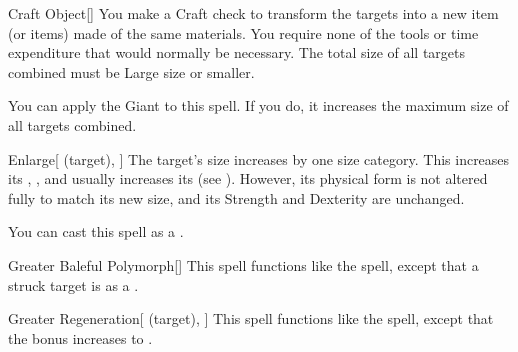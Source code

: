\lowercase{\hypertarget{spell:Craft Object}{}}\label{spell:Craft Object}
\begin{freeability}[\nth{3}]{\hypertarget{spell:Craft Object}{Craft Object}}[]
You make a Craft check to transform the targets into a new item (or items) made of the same materials.
You require none of the tools or time expenditure that would normally be necessary.
The total size of all targets combined must be Large size or smaller.

You can apply the Giant  to this spell.
If you do, it increases the maximum size of all targets combined.
\end{freeability}
\vspace{0.25em}



\lowercase{\hypertarget{spell:Enlarge}{}}\label{spell:Enlarge}
\begin{attuneability}[\nth{3}]{\hypertarget{spell:Enlarge}{Enlarge}}[ (target), ]
The target's size increases by one size category.
This increases its , , and usually increases its  (see ).
However, its physical form is not altered fully to match its new size, and its Strength and Dexterity are unchanged.

You can cast this spell as a .
\end{attuneability}
\vspace{0.25em}



\lowercase{\hypertarget{spell:Greater Baleful Polymorph}{}}\label{spell:Greater Baleful Polymorph}
\begin{freeability}[\nth{4}]{\hypertarget{spell:Greater Baleful Polymorph}{Greater Baleful Polymorph}}[]
This spell functions like the  spell, except that a struck target is  as a .
\end{freeability}
\vspace{0.25em}



\lowercase{\hypertarget{spell:Greater Regeneration}{}}\label{spell:Greater Regeneration}
\begin{attuneability}[\nth{4}]{\hypertarget{spell:Greater Regeneration}{Greater Regeneration}}[ (target), ]
This spell functions like the  spell, except that the bonus increases to .
\end{attuneability}
\vspace{0.25em}




